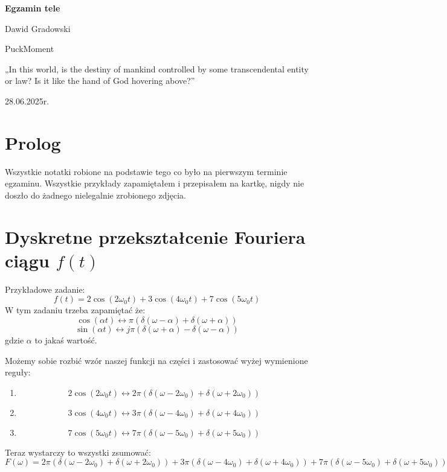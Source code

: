 \documentclass{article}
\begin{document}
\begin{titlepage}
    \centering
    {\Huge\bfseries Egzamin tele\par}
    \vspace{2cm}
    {\Large Dawid Gradowski \par}
    {\large PuckMoment \par}
    \vfill

    \begin{quoting}[]
        \begin{center}
            \Large„In this world, is the destiny of mankind controlled by some transcendental entity or law? Is it like the hand of God hovering above?”
        \end{center}
    \end{quoting}
    
    \vfill
    {\large 28.06.2025r.\par}
\end{titlepage}
\tableofcontents
\section*{Prolog}
Wszystkie notatki robione na podstawie tego co było na pierwszym terminie egzaminu.
Wszystkie przykłady zapamiętałem i przepisałem na kartkę, nigdy nie doszło do żadnego nielegalnie
zrobionego zdjęcia.
\section{Dyskretne przekształcenie Fouriera ciągu $f(t)$}
Przykładowe zadanie:
\[
    f(t) = 2 \cos(2\omega_0 t) + 3 \cos(4\omega_0 t) + 7 \cos(5 \omega_0 t)
\]
W tym zadaniu trzeba zapamiętać że:
\[
    \cos(\alpha t) \longleftrightarrow \pi(\delta (\omega - \alpha) + \delta (\omega + \alpha))
\]
\[
    \sin(\alpha t) \longleftrightarrow j \pi(\delta (\omega + \alpha) - \delta (\omega - \alpha))
\]
gdzie $\alpha$ to jakaś wartość.

Możemy sobie rozbić wzór naszej funkcji na części i zastosować wyżej wymienione reguły:
\begin{enumerate}
    \item {
        \[
            2\cos(2\omega_0 t) \longleftrightarrow 2\pi(\delta (\omega - 2\omega_0) + \delta (\omega + 2\omega_0))
        \]
    }
    \item {
        \[
            3\cos(4\omega_0 t) \longleftrightarrow 3\pi(\delta (\omega - 4\omega_0) + \delta (\omega + 4\omega_0))
        \]
    }
    \item {
        \[
            7\cos(5\omega_0 t) \longleftrightarrow 7\pi(\delta (\omega - 5\omega_0) + \delta (\omega + 5\omega_0))
        \]
    }
\end{enumerate}
Teraz wystarczy to wszystki zsumować:
\[
    F(\omega) = 2\pi(\delta (\omega - 2\omega_0) + \delta (\omega + 2\omega_0)) + 3\pi(\delta (\omega - 4\omega_0) + \delta (\omega + 4\omega_0)) + 7\pi(\delta (\omega - 5\omega_0) + \delta (\omega + 5\omega_0))
\]
\end{document}
